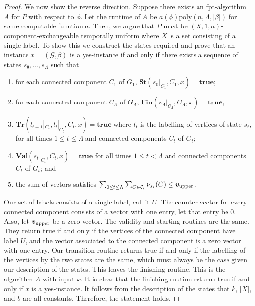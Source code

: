 \documentclass[a4paper,UKenglish,cleveref, autoref, thm-restate]{lipics-v2021} %
\begin{document}
\begin{proof}
    We now show the reverse direction. Suppose there exists an fpt-algorithm $A$ for $P$ with respect to $\phi$. Let the runtime of $A$ be $a(\phi)\text{poly}(n,\Lambda,|\beta|)$ for some computable function $a$. Then, we argue that $P$ must be $(X,1,a)$-component-exchangeable temporally uniform where $X$ is a set consisting of a single label. To show this we construct the states required and prove that an instance $x=(\mathcal{G},\beta)$ is a yes-instance if and only if 
    there exists a sequence of states $s_0,\ldots,s_{\Lambda}$ such that 
    \begin{enumerate}
        \item for each connected component $C_1$ of $G_1$, $\textbf{St}(s_0|_{C_1},C_1,x)=\textbf{true}$;
        \item for each connected component $C_{\Lambda}$ of $G_{\Lambda}$, $\textbf{Fin}(s_{\Lambda}|_{C_{\Lambda}},C_{\Lambda},x)=\textbf{true}$;
        \item $\textbf{Tr}(l_{t-1}|_{C_t}, l_t|_{C_t}, C_t,x)=\textbf{true}$ where $l_t$ is the labelling of vertices of state $s_t$, for all times $1 \leq t \leq \Lambda$ and connected components $C_t$ of $G_t$;
        \item $\textbf{Val}(s_t|_{C_t}, C_t,x)=\textbf{true}$ for all times $1 \leq t < \Lambda$ and connected components $C_t$ of $G_t$; and
        \item the sum of vectors satisfies $\sum_{0\leq t\leq \Lambda} \sum_{C \in\mathcal{C}_t}\nu_{s_t} (C)\leq \textbf{\emph{v}}_{\text{upper}}$.
    \end{enumerate} 
    Our set of labels consists of a single label, call it $U$. The counter vector for every connected component consists of a vector with one entry, let that entry be $0$. Also, let $\textbf{\emph{v}}_{\text{upper}}$ be a zero vector. 
    The validity and starting routines are the same. They return true if and only if the vertices of the connected component have label $U$, and the vector associated to the connected component is a zero vector with one entry. 
    Our transition routine returns true if and only if the labelling of the vertices by the two states are the same, which must always be the case given our description of the states. This leaves the finishing routine. This is the algorithm $A$ with input $x$. It is clear that the finishing routine returns true if and only if $x$ is a yes-instance. It follows from the description of the states that $k$, $|X|$, and $b$ are all constants. Therefore, the statement holds.
\end{proof}
\end{document}
